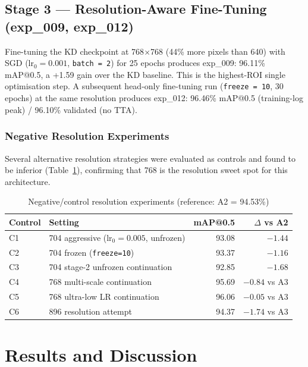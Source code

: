 \documentclass[11pt,a4paper]{article}
\begin{document}
\subsection{Stage 3 --- Resolution-Aware Fine-Tuning (exp\_009, exp\_012)}

Fine-tuning the KD checkpoint at 768$\times$768 (44\% more pixels than 640) with SGD
($\text{lr}_0 = 0.001$, \texttt{batch = 2}) for 25 epochs produces exp\_009: 96.11\%
mAP@0.5, a +1.59 gain over the KD baseline. This is the highest-ROI single optimisation
step. A subsequent head-only fine-tuning run (\texttt{freeze = 10}, 30 epochs) at the
same resolution produces exp\_012: 96.46\% mAP@0.5 (training-log peak) / 96.10\%
validated (no TTA).

\subsubsection{Negative Resolution Experiments}

Several alternative resolution strategies were evaluated as controls and found to be
inferior (Table~\ref{tab:neg_controls}), confirming that 768 is the resolution sweet spot
for this architecture.

\begin{table}[H]
\centering
\caption{Negative/control resolution experiments (reference: A2 = 94.53\%)}
\label{tab:neg_controls}
\begin{tabular}{llrr}
\toprule
\textbf{Control} & \textbf{Setting} & \textbf{mAP@0.5} & \textbf{$\Delta$ vs A2} \\
\midrule
C1 & 704 aggressive ($\text{lr}_0{=}0.005$, unfrozen) & 93.08 & $-1.44$ \\
C2 & 704 frozen (\texttt{freeze=10})                  & 93.37 & $-1.16$ \\
C3 & 704 stage-2 unfrozen continuation                & 92.85 & $-1.68$ \\
C4 & 768 multi-scale continuation                     & 95.69 & $-0.84$ vs A3 \\
C5 & 768 ultra-low LR continuation                    & 96.06 & $-0.05$ vs A3 \\
C6 & 896 resolution attempt                           & 94.37 & $-1.74$ vs A3 \\
\bottomrule
\end{tabular}
\end{table}

\section{Results and Discussion}
\label{sec:results}
\end{document}
